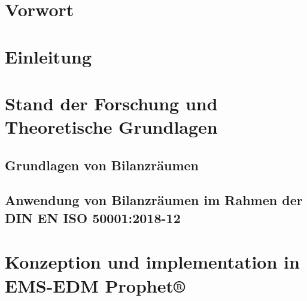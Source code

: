 \documentclass[a4paper,10pt,twoside]{report}
\begin{document}
\chapter*{Vorwort}
\tableofcontents

\chapter{Einleitung}
\setcounter{page}{1}














\chapter{Stand der Forschung und Theoretische Grundlagen}
\section{Grundlagen von Bilanzräumen}



\section{Anwendung von Bilanzräumen im Rahmen der DIN EN ISO 50001:2018-12}







\chapter{Konzeption und implementation in EMS-EDM Prophet®}
\end{document}
